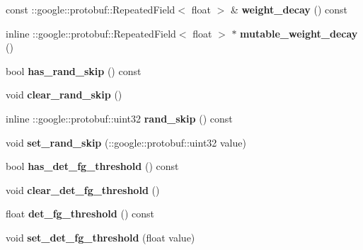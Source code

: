 \begin{DoxyCompactItemize}
const \+::google\+::protobuf\+::\+Repeated\+Field$<$ float $>$ \& {\bfseries weight\+\_\+decay} () const
\item 
\mbox{\label{classcaffe_1_1_v0_layer_parameter_a7fc21ed48b8d5cfc0b77afcf33fc3f61}} 
inline \+::google\+::protobuf\+::\+Repeated\+Field$<$ float $>$ $\ast$ {\bfseries mutable\+\_\+weight\+\_\+decay} ()
\item 
\mbox{\label{classcaffe_1_1_v0_layer_parameter_aba814e170ff15431b9e62db60d13431d}} 
bool {\bfseries has\+\_\+rand\+\_\+skip} () const
\item 
\mbox{\label{classcaffe_1_1_v0_layer_parameter_abd8ad6a20192056a9fddf0194dcb3b93}} 
void {\bfseries clear\+\_\+rand\+\_\+skip} ()
\item 
\mbox{\label{classcaffe_1_1_v0_layer_parameter_a74579c69171872648f0ef616e14be65e}} 
inline \+::google\+::protobuf\+::uint32 {\bfseries rand\+\_\+skip} () const
\item 
\mbox{\label{classcaffe_1_1_v0_layer_parameter_a1b9c833c2488d34ec7417ff4b868d457}} 
void {\bfseries set\+\_\+rand\+\_\+skip} (\+::google\+::protobuf\+::uint32 value)
\item 
\mbox{\label{classcaffe_1_1_v0_layer_parameter_a533ba12a57b0c99c3f6a7bdfd37d5d06}} 
bool {\bfseries has\+\_\+det\+\_\+fg\+\_\+threshold} () const
\item 
\mbox{\label{classcaffe_1_1_v0_layer_parameter_adb3377162b78f69e5e4544cf730f6169}} 
void {\bfseries clear\+\_\+det\+\_\+fg\+\_\+threshold} ()
\item 
\mbox{\label{classcaffe_1_1_v0_layer_parameter_ad81561eaccb6924436b666acca3e6b5f}} 
float {\bfseries det\+\_\+fg\+\_\+threshold} () const
\item 
\mbox{\label{classcaffe_1_1_v0_layer_parameter_a5ef4f12a61e5facab03b237d921b5f30}} 
void {\bfseries set\+\_\+det\+\_\+fg\+\_\+threshold} (float value)

\end{DoxyCompactItemize}
